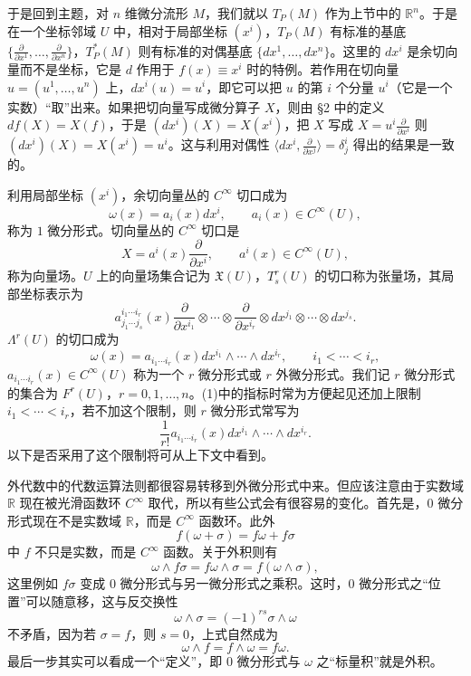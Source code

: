于是回到主题，对 $n$ 维微分流形 $M$，我们就以 $T_P(M)$ 作为上节中的 $\mathbb R^n$。于是在一个坐标邻域 $U$ 中，相对于局部坐标 $(x^i)$，$T_P(M)$ 有标准的基底 $\{\frac{\partial}{\partial x^1},\ldots,\frac{\partial}{\partial x^n}\}$，$T_P^*(M)$ 则有标准的对偶基底 $\{dx^1,\ldots,dx^n\}$。这里的 $dx^i$ 是余切向量而不是坐标，它是 $d$ 作用于 $f(x)\equiv x^i$ 时的特例。若作用在切向量 $u=(u^1,\ldots,u^n)$ 上，$dx^i(u)=u^i$，即它可以把 $u$ 的第 $i$ 个分量 $u^i$（它是一个实数）“取”出来。如果把切向量写成微分算子 $X$，则由 §2 中的定义 $df(X)=X(f)$，于是 $(dx^i)(X)=X(x^i)$，把 $X$ 写成 $X=u^i\frac{\partial}{\partial x^i}$ 则 $(dx^i)(X)=X(x^i)=u^i$。这与利用对偶性 $\langle dx^i,\frac{\partial}{\partial x^j}\rangle=\delta^i_j$ 得出的结果是一致的。

利用局部坐标 $(x^i)$，余切向量丛的 $C^\infty$ 切口成为
\[
 \omega(x)=a_i(x)dx^i,\qquad a_i(x)\in C^\infty(U),
\]
称为 $1$ 微分形式。切向量丛的 $C^\infty$ 切口是
\[
 X=a^i(x)\frac{\partial}{\partial x^i},\qquad a^i(x)\in C^\infty(U),
\]
称为向量场。$U$ 上的向量场集合记为 $\mathfrak X(U)$，$T^r_s(U)$ 的切口称为张量场，其局部坐标表示为
\[
 a^{i_1\cdots i_r}_{j_1\cdots j_s}(x)
 \frac{\partial}{\partial x^{i_1}}\otimes\cdots\otimes\frac{\partial}{\partial x^{i_r}}
 \otimes dx^{j_1}\otimes\cdots\otimes dx^{j_s}.
\]
$\Lambda^r(U)$ 的切口成为
\begin{equation}
 \omega(x)=a_{i_1\cdots i_r}(x)dx^{i_1}\wedge\cdots\wedge dx^{i_r},\qquad i_1<\cdots<i_r,
 \tag{1}
\end{equation}
$a_{i_1\cdots i_r}(x)\in C^\infty(U)$ 称为一个 $r$ 微分形式或 $r$ 外微分形式。我们记 $r$ 微分形式的集合为 $F^r(U)$，$r=0,1,\ldots,n$。(1)中的指标时常为方便起见还加上限制 $i_1<\cdots<i_r$，若不加这个限制，则 $r$ 微分形式常写为
\begin{equation}
 \frac1{r!}a_{i_1\cdots i_r}(x)dx^{i_1}\wedge\cdots\wedge dx^{i_r}.
 \tag{1'}
\end{equation}
以下是否采用了这个限制将可从上下文中看到。

外代数中的代数运算法则都很容易转移到外微分形式中来。但应该注意由于实数域 $\mathbb R$ 现在被光滑函数环 $C^\infty$ 取代，所以有些公式会有很容易的变化。首先是，$0$ 微分形式现在不是实数域 $\mathbb R$，而是 $C^\infty$ 函数环。此外
\[
 f(\omega+\sigma)=f\omega+f\sigma
\]
中 $f$ 不只是实数，而是 $C^\infty$ 函数。关于外积则有
\[
 \omega\wedge f\sigma=f\omega\wedge\sigma=f(\omega\wedge\sigma),
\]
这里例如 $f\sigma$ 变成 $0$ 微分形式与另一微分形式之乘积。这时，$0$ 微分形式之“位置”可以随意移，这与反交换性
\[
 \omega\wedge\sigma=(-1)^{rs}\sigma\wedge\omega
\]
不矛盾，因为若 $\sigma=f$，则 $s=0$，上式自然成为
\[
 \omega\wedge f=f\wedge\omega=f\omega.
\]
最后一步其实可以看成一个“定义”，即 $0$ 微分形式与 $\omega$ 之“标量积”就是外积。

